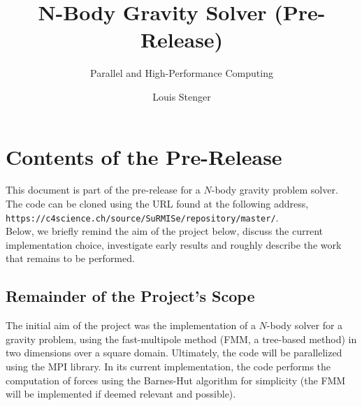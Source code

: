 \documentclass[10pt,a4paper]{scrartcl}
\author{Louis Stenger}
\title{N-Body Gravity Solver (Pre-Release)}
\subtitle{Parallel and High-Performance Computing}
\begin{document}
	\maketitle
	\section{Contents of the Pre-Release}
	This document is part of the pre-release for a $N$-body gravity problem solver. The code can be cloned using the URL found at the following address,\\\texttt{https://c4science.ch/source/SuRMISe/repository/master/}.\\ Below, we briefly remind the aim of the project below, discuss the current implementation choice, investigate early results and roughly describe the work that remains to be performed.
	
	\subsection{Remainder of the Project's Scope}
	The initial aim of the project was the implementation of a $N$-body solver for a gravity problem, using the fast-multipole method (FMM, a tree-based method) in two dimensions over a square domain. Ultimately, the code will be parallelized using the MPI library. In its current implementation, the code performs the computation of forces using the Barnes-Hut algorithm for simplicity (the FMM will be implemented if deemed relevant and possible).
	
\end{document}
